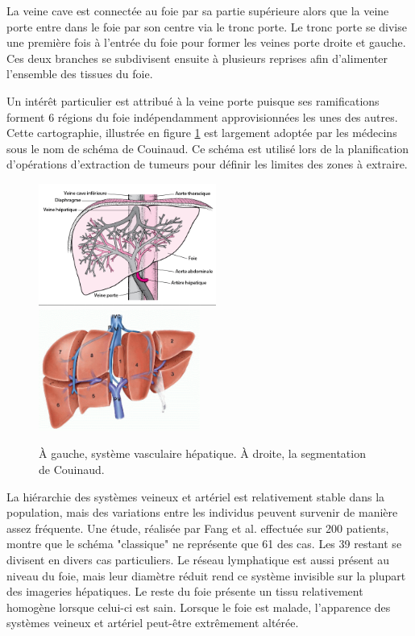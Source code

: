 La veine cave est connectée au foie par sa partie supérieure alors que la veine porte entre dans le foie par son centre via le tronc porte. Le tronc porte se divise une première fois à l'entrée du foie pour former les veines  porte droite et gauche. Ces deux branches se subdivisent ensuite à plusieurs reprises afin d'alimenter l'ensemble des tissues du foie. 

Un intérêt particulier est attribué à la veine porte puisque ses ramifications forment 6 régions du foie indépendamment approvisionnées les unes des autres. Cette cartographie, illustrée en figure \ref{fig:liver veins} est largement adoptée par les médecins sous le nom de schéma de Couinaud. Ce schéma est utilisé lors de la planification d'opérations d'extraction de tumeurs pour définir les limites des zones à extraire.

\begin{figure}
    \centering
    \includegraphics[height=4cm]{Images/Liver_vasculature.png}
    \includegraphics[height=4cm]{Images/Couinaud.png}
    \caption{À gauche, système vasculaire hépatique. À droite, la segmentation de Couinaud.}
    \label{fig:liver veins}
\end{figure}


La hiérarchie des systèmes veineux et artériel est relativement stable dans la population, mais des variations entre les individus peuvent survenir de manière assez fréquente. Une étude, réalisée par Fang et al. \cite{Fang2012_Liver_vein_variations} effectuée sur 200 patients, montre que le schéma "classique" ne représente que 61 \percent des cas. Les 39 \percent restant se divisent en divers cas particuliers. Le réseau lymphatique est aussi présent au niveau du foie, mais leur diamètre réduit rend ce système invisible sur la plupart des imageries hépatiques. Le reste du foie présente un tissu relativement homogène lorsque celui-ci est sain.
Lorsque le foie est malade, l'apparence des systèmes veineux et artériel peut-être extrêmement altérée. 

